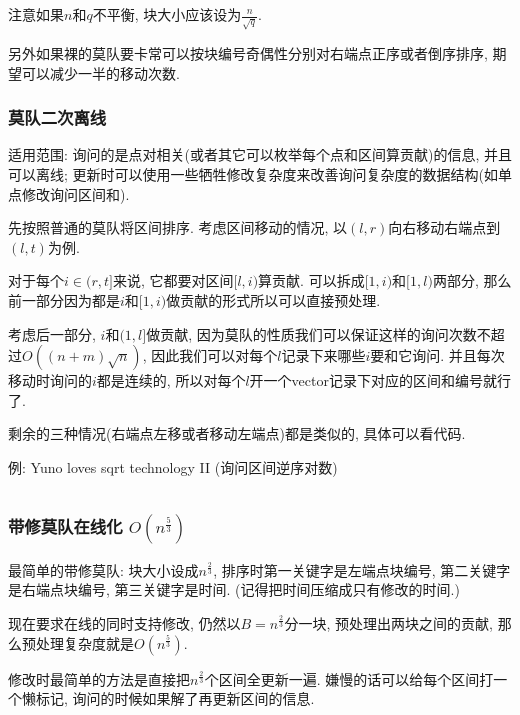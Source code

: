 注意如果$n$和$q$不平衡, 块大小应该设为$\frac n {\sqrt q}$.

另外如果裸的莫队要卡常可以按块编号奇偶性分别对右端点正序或者倒序排序, 期望可以减少一半的移动次数.



\subsubsection{莫队二次离线}

适用范围: 询问的是点对相关(或者其它可以枚举每个点和区间算贡献)的信息, 并且可以离线; 更新时可以使用一些牺牲修改复杂度来改善询问复杂度的数据结构(如单点修改询问区间和).

先按照普通的莫队将区间排序. 考虑区间移动的情况, 以$(l, r)$向右移动右端点到$(l, t)$为例.

对于每个$i \in (r, t]$来说, 它都要对区间$[l, i)$算贡献. 可以拆成$[1, i)$和$[1, l)$两部分, 那么前一部分因为都是$i$和$[1, i)$做贡献的形式所以可以直接预处理.

考虑后一部分, $i$和$(1, l]$做贡献, 因为莫队的性质我们可以保证这样的询问次数不超过$O((n + m)\sqrt n)$, 因此我们可以对每个$l$记录下来哪些$i$要和它询问. 并且每次移动时询问的$i$都是连续的, 所以对每个$l$开一个vector记录下对应的区间和编号就行了.

剩余的三种情况(右端点左移或者移动左端点)都是类似的, 具体可以看代码.

例: Yuno loves sqrt technology II (询问区间逆序对数)

\inputminted{cpp}{../src/datastructure/莫队二次离线.cpp}

\subsubsection{带修莫队在线化 $O(n ^ {\frac 5 3})$}

最简单的带修莫队: 块大小设成$n^{\frac 2 3}$, 排序时第一关键字是左端点块编号, 第二关键字是右端点块编号, 第三关键字是时间. (记得把时间压缩成只有修改的时间.)

现在要求在线的同时支持修改, 仍然以$B = n^{\frac 2 3}$分一块, 预处理出两块之间的贡献, 那么预处理复杂度就是$O(n ^ {\frac 5 3})$.

修改时最简单的方法是直接把$n^{\frac 2 3}$个区间全更新一遍. 嫌慢的话可以给每个区间打一个懒标记, 询问的时候如果解了再更新区间的信息.

